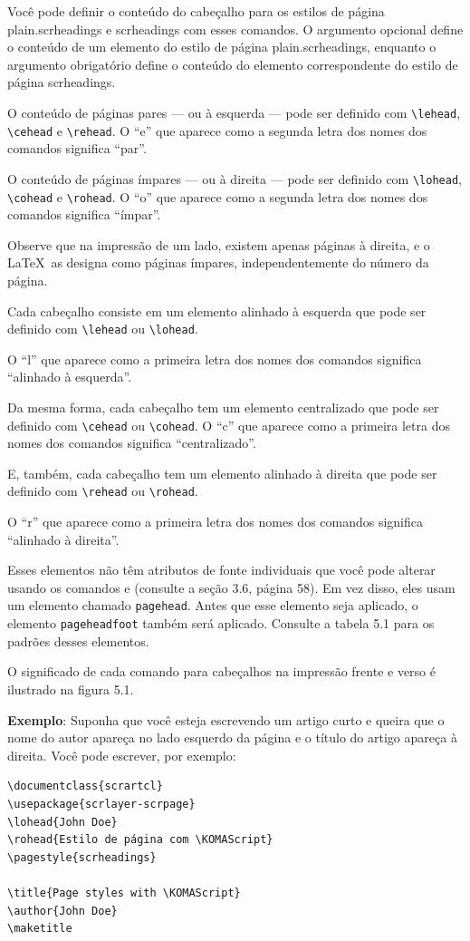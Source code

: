 Você pode definir o conteúdo do cabeçalho para os estilos de página plain.scrheadings e scrheadings com esses comandos. O argumento opcional define o conteúdo de um elemento do estilo de página plain.scrheadings, enquanto o argumento obrigatório define o conteúdo do elemento correspondente do estilo de página scrheadings.

O conteúdo de páginas pares — ou à esquerda — pode ser definido com \verb|\lehead|, \verb|\cehead| e \verb|\rehead|. O “e” que aparece como a segunda letra dos nomes dos comandos significa “par”.

O conteúdo de páginas ímpares — ou à direita — pode ser definido com \verb|\lohead|, \verb|\cohead| e \verb|\rohead|. O “o” que aparece como a segunda letra dos nomes dos comandos significa “ímpar”.

Observe que na impressão de um lado, existem apenas páginas à direita, e o \LaTeX\ as designa como páginas ímpares, independentemente do número da página.

Cada cabeçalho consiste em um elemento alinhado à esquerda que pode ser definido com \verb|\lehead| ou \verb|\lohead|.

O “l” que aparece como a primeira letra dos nomes dos comandos significa “alinhado à esquerda”.

Da mesma forma, cada cabeçalho tem um elemento centralizado que pode ser definido com \verb|\cehead| ou \verb|\cohead|. O “c” que aparece como a primeira letra dos nomes dos comandos significa “centralizado”.

E, também, cada cabeçalho tem um elemento alinhado à direita que pode ser definido com \verb|\rehead| ou \verb|\rohead|.

O “r” que aparece como a primeira letra dos nomes dos comandos significa “alinhado à direita”.

Esses elementos não têm atributos de fonte individuais que você pode alterar usando os comandos  e  (consulte a seção 3.6, página 58). Em vez disso, eles usam um elemento chamado \texttt{page\-head}. Antes que esse elemento seja aplicado, o elemento \texttt{pa\-ge\-head\-foot} também será aplicado. Consulte a tabela 5.1 para os padrões desses elementos.

O significado de cada comando para cabeçalhos na impressão frente e verso é ilustrado na figura 5.1.

\textbf{Exemplo}: Suponha que você esteja escrevendo um artigo curto e queira que o nome do autor apareça no lado esquerdo da página e o título do artigo apareça à direita. Você pode escrever, por exemplo:
\begin{small}
\begin{verbatim}
\documentclass{scrartcl}
\usepackage{scrlayer-scrpage}
\lohead{John Doe}
\rohead{Estilo de página com \KOMAScript}
\pagestyle{scrheadings}

\title{Page styles with \KOMAScript}
\author{John Doe}
\maketitle
  
\end{verbatim} 
\end{small}

